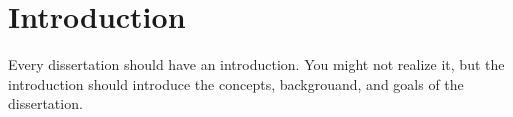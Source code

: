 \chapter{Introduction} \label{sec:intro}

Every dissertation should have an introduction.  You might not realize
it, but the introduction should introduce the concepts, backgrouand,
and goals of the dissertation.

